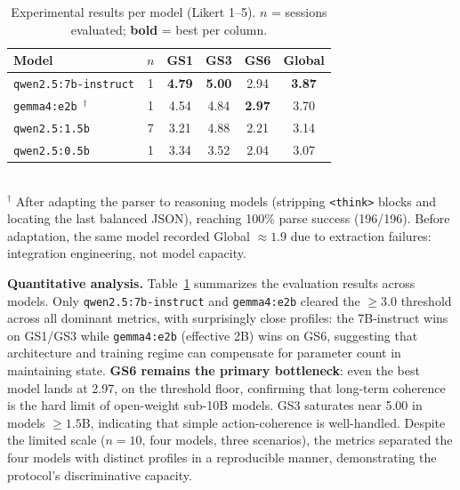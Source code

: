 \documentclass[12pt]{article}
\begin{document}
\begin{table}[ht]
\centering
\caption{Experimental results per model (Likert 1--5). $n$ = sessions evaluated; \textbf{bold} = best per column.}
\label{tab:results}
\small
\begin{tabular}{lccccc}
\toprule
\textbf{Model} & $n$ & \textbf{GS1} & \textbf{GS3} & \textbf{GS6} & \textbf{Global} \\
\midrule
\texttt{qwen2.5:7b-instruct}                           & 1 & \textbf{4.79} & \textbf{5.00} & 2.94          & \textbf{3.87} \\
\texttt{gemma4:e2b}~$^{\dagger}$ \cite{deepmind:gemma4:2026} & 1 & 4.54          & 4.84          & \textbf{2.97} & 3.70          \\
\texttt{qwen2.5:1.5b}                                  & 7 & 3.21          & 4.88          & 2.21          & 3.14          \\
\texttt{qwen2.5:0.5b}                                  & 1 & 3.34          & 3.52          & 2.04          & 3.07          \\
\bottomrule
\end{tabular}
\\[2pt]
{\footnotesize $^{\dagger}$ After adapting the parser to reasoning models (stripping \texttt{<think>} blocks and locating the last balanced JSON), reaching 100\% parse success (196/196). Before adaptation, the same model recorded Global $\approx 1.9$ due to extraction failures: integration engineering, not model capacity.}
\end{table}

\textbf{Quantitative analysis.} Table~\ref{tab:results} summarizes the evaluation results across models. Only \texttt{qwen2.5:7b-instruct} and \texttt{gemma4:e2b} cleared the $\geq 3.0$ threshold across all dominant metrics, with surprisingly close profiles: the 7B-instruct wins on GS1/GS3 while \texttt{gemma4:e2b} (effective 2B) wins on GS6, suggesting that architecture and training regime can compensate for parameter count in maintaining state. \textbf{GS6 remains the primary bottleneck}: even the best model lands at 2.97, on the threshold floor, confirming that long-term coherence is the hard limit of open-weight sub-10B models. GS3 saturates near 5.00 in models $\geq 1.5$B, indicating that simple action-coherence is well-handled. Despite the limited scale ($n=10$, four models, three scenarios), the metrics separated the four models with distinct profiles in a reproducible manner, demonstrating the protocol's discriminative capacity.
\end{document}
